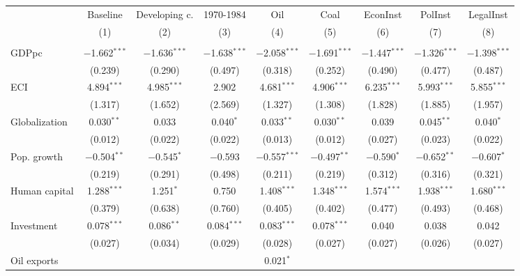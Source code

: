 
\begin{tabular}{@{\hspace{5pt}}l@{\hspace{5pt}}cccccccc} 
\toprule 
 & Baseline & Developing c. & 1970-1984 & Oil & Coal & EconInst & PolInst & LegalInst \\ 
 & (1) & (2) & (3) & (4) & (5) & (6) & (7) & (8)\\ 
\midrule  
\\[-2.1ex] GDPpc & $-$1.662$^{***}$ & $-$1.636$^{***}$ & $-$1.638$^{***}$ & $-$2.058$^{***}$ & $-$1.691$^{***}$ & $-$1.447$^{***}$ & $-$1.326$^{***}$ & $-$1.398$^{***}$ \\ 
  & (0.239) & (0.290) & (0.497) & (0.318) & (0.252) & (0.490) & (0.477) & (0.487) \\ 
 \addlinespace 
 ECI & 4.894$^{***}$ & 4.985$^{***}$ & 2.902 & 4.681$^{***}$ & 4.906$^{***}$ & 6.235$^{***}$ & 5.993$^{***}$ & 5.855$^{***}$ \\ 
  & (1.317) & (1.652) & (2.569) & (1.327) & (1.308) & (1.828) & (1.885) & (1.957) \\ 
 \addlinespace 
 Globalization & 0.030$^{**}$ & 0.033 & 0.040$^{*}$ & 0.033$^{**}$ & 0.030$^{**}$ & 0.039 & 0.045$^{**}$ & 0.040$^{*}$ \\ 
  & (0.012) & (0.022) & (0.022) & (0.013) & (0.012) & (0.027) & (0.023) & (0.022) \\ 
 \addlinespace 
 Pop. growth & $-$0.504$^{**}$ & $-$0.545$^{*}$ & $-$0.593 & $-$0.557$^{***}$ & $-$0.497$^{**}$ & $-$0.590$^{*}$ & $-$0.652$^{**}$ & $-$0.607$^{*}$ \\ 
  & (0.219) & (0.291) & (0.498) & (0.211) & (0.219) & (0.312) & (0.316) & (0.321) \\ 
 \addlinespace 
 Human capital & 1.288$^{***}$ & 1.251$^{*}$ & 0.750 & 1.408$^{***}$ & 1.348$^{***}$ & 1.574$^{***}$ & 1.938$^{***}$ & 1.680$^{***}$ \\ 
  & (0.379) & (0.638) & (0.760) & (0.405) & (0.402) & (0.477) & (0.493) & (0.468) \\ 
 \addlinespace 
 Investment & 0.078$^{***}$ & 0.086$^{**}$ & 0.084$^{***}$ & 0.083$^{***}$ & 0.078$^{***}$ & 0.040 & 0.038 & 0.042 \\ 
  & (0.027) & (0.034) & (0.029) & (0.028) & (0.027) & (0.027) & (0.026) & (0.027) \\ 
 \addlinespace 
 Oil exports &  &  &  & 0.021$^{*}$ &  &  &  &  \\ 

\end{tabular}
